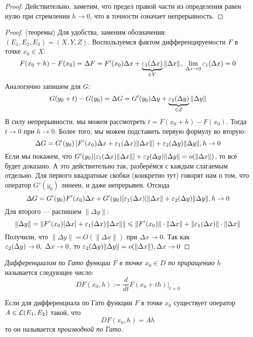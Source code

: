 \begin{proof}
	Действительно, заметим, что предел правой части из определения равен нулю при стремлении $h \to 0$, что в точности означает непрерывность.
\end{proof}

\begin{proof} (теоремы)
	Для удобства, заменим обозначения: $(E_1, E_2, E_3) = (X, Y, Z)$. Воспользуемся фактом дифференцируемости $F$ в точке $x_0 \in X$:
	\[
		F(x_0 + h) - F(x_0) = \Delta F = F'(x_0)\Delta x + \underbrace{\eps_1(\Delta x)}_{\in Y}\|\Delta x\|,\ \lim_{\Delta x \to 0} \eps_1(\Delta x) = 0
	\]
	Аналогично запишем для $G$:
	\[
		G(y_0 + t) - G(y_0) = \Delta G = G'(y_0)\Delta y + \underbrace{\varepsilon_2(\Delta y)}_{\in Z}\|\Delta y\|
	\]
	В силу непрерывности, мы можем рассмотреть $t = F(x_0 + h) - F(x_0)$. Тогда $t \to 0$ при $h \to 0$. Более того, мы можем подставить первую формулу во вторую:
	\[
		\Delta G = G'(y_0)\left[F'(x_0)\Delta x + \varepsilon_1(\Delta x)\|\Delta x\|\right] + \varepsilon_2(\Delta y)\|\Delta y\|, h \to 0
	\]
	Если мы покажем, что $G'(y_0)[\varepsilon_1(\Delta x)\|\Delta x\|] + \varepsilon_2(\Delta y)\|\Delta y\| = o(\|\Delta x\|)$, то всё будет доказано. А это действительно так, разберёмся с каждым слагаемым отдельно. Для первого квадратные скобки (конкретно тут) говорят нам о том, что оператор $G'(y_0)$ линеен, и даже непрерывен. Отсюда
	\[
		\Delta G = G'(y_0)F'(x_0)\Delta x + G'(y_0)[\varepsilon_1(\Delta x)]\|\Delta x\| + \varepsilon_2(\Delta y)\|\Delta y\|, h \to 0
	\]
	Для второго --- распишем $\|\Delta y\|$:
	\[
		\|\Delta y\| = \|F'(x_0)[\Delta x] + \varepsilon_1(\Delta x)\|\Delta x\|\| \leqslant \|F'(x_0)\| \cdot \|\Delta x\| + \|\varepsilon_1(\Delta x)\| \cdot \|\Delta x\|
	\]
	Получили, что $\|\Delta y\| = O(\|\Delta x\|)$ при $\Delta x \to 0$. Так как $\varepsilon_2(\Delta y) \to 0,\ \Delta x \to 0$, то $\varepsilon_2(\Delta y)\|\Delta y\| = o(\|\Delta x\|), \Delta x \to 0$
\end{proof}

\begin{definition}
	\textit{Дифференциалом по Гато функции $F$ в точке $x_0 \in D$ по приращению $h$} называется следующее число:
	\[
		DF(x_0, h) := \frac{d}{dt}F(x_0 + th)|_{t = 0}
	\]
\end{definition}

\begin{definition}
	Если для дифференциала по Гато функции $F$ в точке $x_0$ существует оператор $A \in \mathcal{L}(E_1, E_2)$ такой, что
	\[
		DF(x_0, h) = Ah
	\]
	то он называется \textit{производной по Гато}.
\end{definition}

